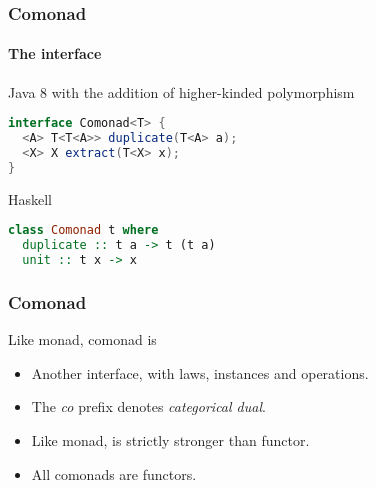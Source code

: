 \begin{frame}[fragile]
\frametitle{Comonad}
\framesubtitle{The interface}
\begin{block}{Java 8 with the addition of higher-kinded polymorphism}
\begin{lstlisting}[style=language,language=java]
interface Comonad<T> {
  <A> T<T<A>> duplicate(T<A> a);
  <X> X extract(T<X> x);
}
\end{lstlisting}
\end{block}
\begin{block}{Haskell}
\begin{lstlisting}[style=language,language=haskell]
class Comonad t where
  duplicate :: t a -> t (t a)
  unit :: t x -> x
\end{lstlisting}
\end{block}
\end{frame}

\begin{frame}[fragile]
\frametitle{Comonad}
\begin{block}{Like monad, comonad is}
\begin{itemize}
\item Another interface, with laws, instances and operations.
\item The \emph{co} prefix denotes \emph{categorical dual}.
\item Like monad, is strictly stronger than functor.
\item All comonads are functors.
\end{itemize}
\end{block}
\end{frame}

